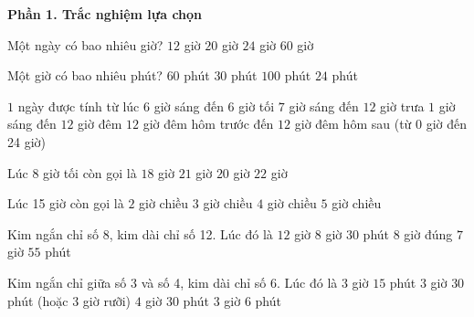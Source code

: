 \textbf{Phần 1. Trắc nghiệm lựa chọn}

\begin{ex} %
Một ngày có bao nhiêu giờ?
\choice
{$12$ giờ}
{$20$ giờ}
{\True $24$ giờ}
{$60$ giờ}
\end{ex}

\begin{ex} %
Một giờ có bao nhiêu phút?
\choice
{\True $60$ phút}
{$30$ phút}
{$100$ phút}
{$24$ phút}
\end{ex}

\begin{ex} %
$1$ ngày được tính từ lúc
\choice
{$6$ giờ sáng đến $6$ giờ tối}
{$7$ giờ sáng đến $12$ giờ trưa}
{$1$ giờ sáng đến $12$ giờ đêm}
{\True $12$ giờ đêm hôm trước đến $12$ giờ đêm hôm sau (từ 0 giờ đến 24 giờ)}
\end{ex}

\begin{ex} %
Lúc 8 giờ tối còn gọi là
\choice
{$18$ giờ}
{$21$ giờ}
{\True $20$ giờ}
{$22$ giờ}
\end{ex}

\begin{ex} %
Lúc 15 giờ còn gọi là
\choice
{$2$ giờ chiều}
{\True $3$ giờ chiều}
{$4$ giờ chiều}
{$5$ giờ chiều}
\end{ex}

\begin{ex} %
Kim ngắn chỉ số 8, kim dài chỉ số 12. Lúc đó là
\choice
{$12$ giờ}
{$8$ giờ $30$ phút}
{\True $8$ giờ đúng}
{$7$ giờ $55$ phút}
\end{ex}

\begin{ex} %
Kim ngắn chỉ giữa số 3 và số 4, kim dài chỉ số 6. Lúc đó là
\choice
{$3$ giờ $15$ phút}
{\True $3$ giờ $30$ phút (hoặc 3 giờ rưỡi)}
{$4$ giờ $30$ phút}
{$3$ giờ $6$ phút}
\end{ex}

